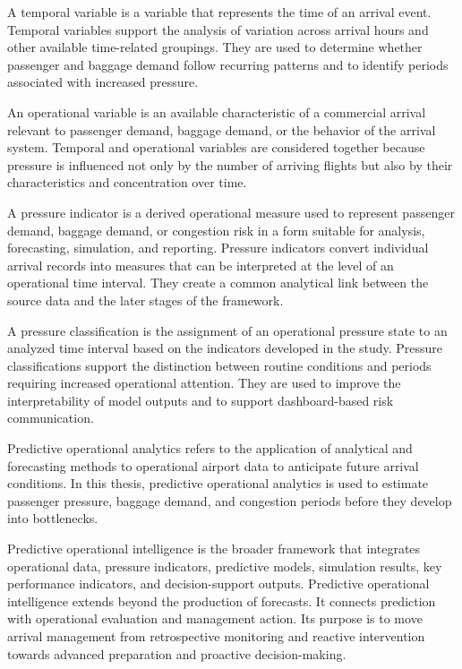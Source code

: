 A temporal variable is a variable that represents the time of an arrival event. Temporal variables support the analysis of variation across arrival hours and other available time-related groupings. They are used to determine whether passenger and baggage demand follow recurring patterns and to identify periods associated with increased pressure.

An operational variable is an available characteristic of a commercial arrival relevant to passenger demand, baggage demand, or the behavior of the arrival system. Temporal and operational variables are considered together because pressure is influenced not only by the number of arriving flights but also by their characteristics and concentration over time.

A pressure indicator is a derived operational measure used to represent passenger demand, baggage demand, or congestion risk in a form suitable for analysis, forecasting, simulation, and reporting. Pressure indicators convert individual arrival records into measures that can be interpreted at the level of an operational time interval. They create a common analytical link between the source data and the later stages of the framework.

A pressure classification is the assignment of an operational pressure state to an analyzed time interval based on the indicators developed in the study. Pressure classifications support the distinction between routine conditions and periods requiring increased operational attention. They are used to improve the interpretability of model outputs and to support dashboard-based risk communication.

Predictive operational analytics refers to the application of analytical and forecasting methods to operational airport data to anticipate future arrival conditions. In this thesis, predictive operational analytics is used to estimate passenger pressure, baggage demand, and congestion periods before they develop into bottlenecks.

Predictive operational intelligence is the broader framework that integrates operational data, pressure indicators, predictive models, simulation results, key performance indicators, and decision-support outputs. Predictive operational intelligence extends beyond the production of forecasts. It connects prediction with operational evaluation and management action. Its purpose is to move arrival management from retrospective monitoring and reactive intervention towards advanced preparation and proactive decision-making.

